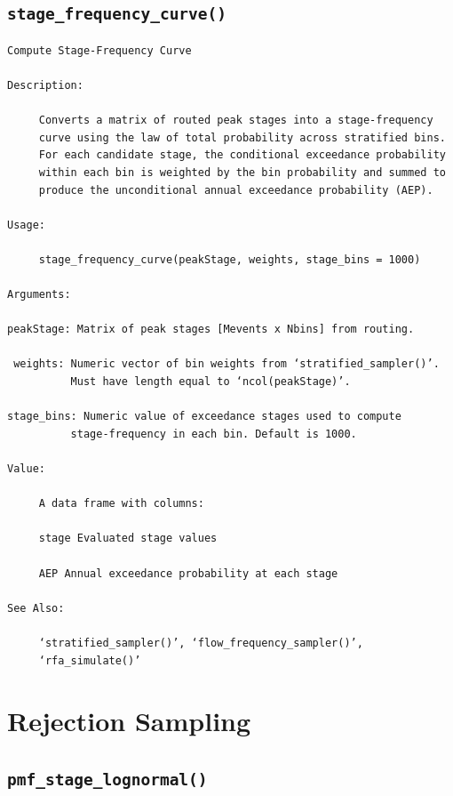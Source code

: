 \documentclass[
  letterpaper,
  DIV=11,
  numbers=noendperiod]{scrreprt}
\begin{document}
\subsection{\texorpdfstring{\texttt{stage\_frequency\_curve()}}{stage\_frequency\_curve()}}\label{stage_frequency_curve}

\begin{verbatim}
Compute Stage-Frequency Curve

Description:

     Converts a matrix of routed peak stages into a stage-frequency
     curve using the law of total probability across stratified bins.
     For each candidate stage, the conditional exceedance probability
     within each bin is weighted by the bin probability and summed to
     produce the unconditional annual exceedance probability (AEP).

Usage:

     stage_frequency_curve(peakStage, weights, stage_bins = 1000)
     
Arguments:

peakStage: Matrix of peak stages [Mevents x Nbins] from routing.

 weights: Numeric vector of bin weights from ‘stratified_sampler()’.
          Must have length equal to ‘ncol(peakStage)’.

stage_bins: Numeric value of exceedance stages used to compute
          stage-frequency in each bin. Default is 1000.

Value:

     A data frame with columns:

     stage Evaluated stage values

     AEP Annual exceedance probability at each stage

See Also:

     ‘stratified_sampler()’, ‘flow_frequency_sampler()’,
     ‘rfa_simulate()’
\end{verbatim}

\section{Rejection Sampling}\label{rejection-sampling}

\subsection{\texorpdfstring{\texttt{pmf\_stage\_lognormal()}}{pmf\_stage\_lognormal()}}\label{pmf_stage_lognormal}
\end{document}
